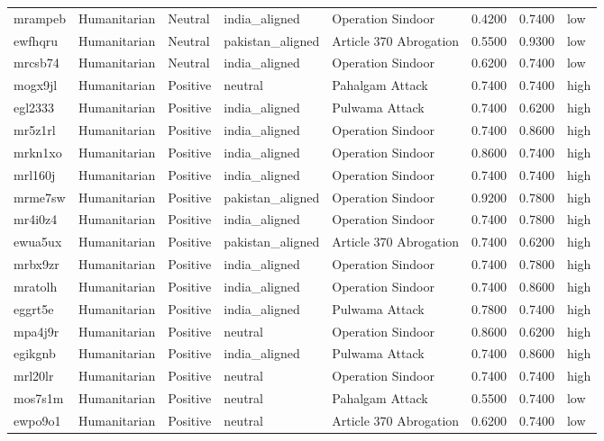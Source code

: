 \begin{longtable}{lllllrrl}
mrampeb & Humanitarian & Neutral & india\_aligned & Operation Sindoor & 0.4200 & 0.7400 & low \\
ewfhqru & Humanitarian & Neutral & pakistan\_aligned & Article 370 Abrogation & 0.5500 & 0.9300 & low \\
mrcsb74 & Humanitarian & Neutral & india\_aligned & Operation Sindoor & 0.6200 & 0.7400 & low \\
mogx9jl & Humanitarian & Positive & neutral & Pahalgam Attack & 0.7400 & 0.7400 & high \\
egl2333 & Humanitarian & Positive & india\_aligned & Pulwama Attack & 0.7400 & 0.6200 & high \\
mr5z1rl & Humanitarian & Positive & india\_aligned & Operation Sindoor & 0.7400 & 0.8600 & high \\
mrkn1xo & Humanitarian & Positive & india\_aligned & Operation Sindoor & 0.8600 & 0.7400 & high \\
mrl160j & Humanitarian & Positive & india\_aligned & Operation Sindoor & 0.7400 & 0.7400 & high \\
mrme7sw & Humanitarian & Positive & pakistan\_aligned & Operation Sindoor & 0.9200 & 0.7800 & high \\
mr4i0z4 & Humanitarian & Positive & india\_aligned & Operation Sindoor & 0.7400 & 0.7800 & high \\
ewua5ux & Humanitarian & Positive & pakistan\_aligned & Article 370 Abrogation & 0.7400 & 0.6200 & high \\
mrbx9zr & Humanitarian & Positive & india\_aligned & Operation Sindoor & 0.7400 & 0.7800 & high \\
mratolh & Humanitarian & Positive & india\_aligned & Operation Sindoor & 0.7400 & 0.8600 & high \\
eggrt5e & Humanitarian & Positive & india\_aligned & Pulwama Attack & 0.7800 & 0.7400 & high \\
mpa4j9r & Humanitarian & Positive & neutral & Operation Sindoor & 0.8600 & 0.6200 & high \\
egikgnb & Humanitarian & Positive & india\_aligned & Pulwama Attack & 0.7400 & 0.8600 & high \\
mrl20lr & Humanitarian & Positive & neutral & Operation Sindoor & 0.7400 & 0.7400 & high \\
mos7s1m & Humanitarian & Positive & neutral & Pahalgam Attack & 0.5500 & 0.7400 & low \\
ewpo9o1 & Humanitarian & Positive & neutral & Article 370 Abrogation & 0.6200 & 0.7400 & low \\

\end{longtable}
